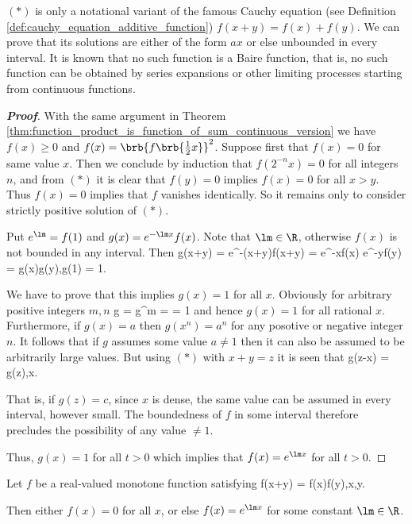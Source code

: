 \begin{remark}
$(*)$ is only a notational variant of the famous Cauchy equation (see Definition \ref{def:cauchy_equation_additive_function}) $f(x+y) = f(x) + f(y)$. We can prove that its solutions are either of the form $ax$ or else unbounded in every interval. It is known that no such function is a Baire function, that is, no such function can be obtained by series expansions or other limiting processes starting from continuous functions.
\end{remark}

\begin{proof}[\bf Proof]
With the same argument in Theorem \ref{thm:function_product_is_function_of_sum_continuous_version} we have $f(x)\geq 0$ and $f(x) = \brb{f\brb{\frac 12 x}}^2$. Suppose first that $f(x) =0$ for same value $x$. Then we conclude by induction that $f(2^{-n}x) = 0$ for all integers $n$, and from $(*)$ it is clear that $f(y)=0$ implies $f(x)=0$ for all $x>y$. Thus $f(x)=0$ implies that $f$ vanishes identically. So it remains only to consider strictly positive solution of $(*)$.

Put $e^{\lm} = f(1)$ and $g(x) = e^{-\lm x}f(x)$. Note that $\lm\in\R$, otherwise $f(x)$ is not bounded in any interval. Then
\be
g(x+y) = e^{-\lm (x+y)}f(x+y) = e^{-\lm x}f(x) e^{-\lm y}f(y) = g(x)g(y),\qquad g(1) = 1.
\ee

We have to prove that this implies $g(x) = 1$ for all $x$. Obviously for arbitrary positive integers $m,n$
\be
g = g^m =  = 1
\ee
and hence $g(x) =1$ for all rational $x$. Furthermore, if $g(x) =a$ then $g(x^n) = a^n$ for any posotive or negative integer $n$. It follows that if $g$ assumes some value $a\neq 1$ then it can also be assumed to be arbitrarily large values. But using $(*)$ with $x+y = z$ it is seen that
\be
g(z-x) = g(z),\qquad x\in \Q.
\ee

That is, if $g(z) = c$, since $x$ is dense, the same value can be assumed in every interval, however small. The boundedness of $f$ in some interval therefore precludes the possibility of any value $\neq 1$.

Thus, $g(x) =1$ for all $t>0$ which implies that $f(x) = e^{\lm x}$ for all $t>0$.
\end{proof}

\begin{corollary}
Let $f$ be a real-valued monotone function satisfying
\be
f(x+y) = f(x)f(y),\qquad x,y\in \R.
\ee

Then either $f(x)=0$ for all $x$, or else $f(x) = e^{\lm x}$ for some constant $\lm\in\R$.
\end{corollary}

